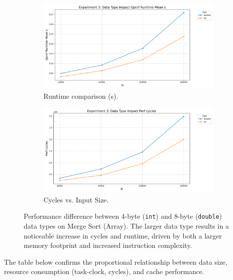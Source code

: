 \documentclass[11pt, a4paper]{article}
\begin{document}
\begin{figure}[h]
    \centering
    \begin{subfigure}[b]{0.48\textwidth}
        \centering
        \includegraphics[width=\textwidth]{plots/experiment_3_data_type_impact_runtime_runtime.png}
        \caption{Runtime comparison (s).}
        \label{fig:exp3_runtime}
    \end{subfigure}
    \hfill
    \begin{subfigure}[b]{0.48\textwidth}
        \centering
        \includegraphics[width=\textwidth]{plots/experiment_3_data_type_impact_cycles.png}
        \caption{Cycles vs. Input Size.}
        \label{fig:exp3_cycles}
    \end{subfigure}
    \caption{Performance difference between 4-byte (\texttt{int}) and 8-byte (\texttt{double}) data types on Merge Sort (Array). The larger data type results in a noticeable increase in cycles and runtime, driven by both a larger memory footprint and increased instruction complexity.}
    \label{fig:datatype_impact_plots}
\end{figure}

The table below confirms the proportional relationship between data size, resource consumption (task-clock, cycles), and cache performance.
\end{document}
